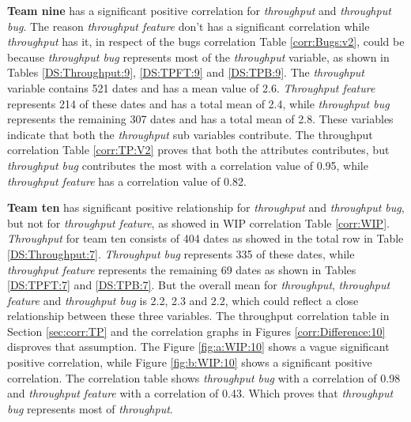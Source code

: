 \documentclass[UKenglish]{ifimaster}  %
\begin{document}
\textbf{Team nine} has a significant positive correlation for \textit{throughput} and \textit{throughput bug}. The reason \textit{throughput feature} don't has a significant correlation while \textit{throughput} has it, in respect of the bugs correlation Table \ref{corr:Bugs:v2}, could be because \textit{throughput bug} represents most of the \textit{throughput} variable, as shown in Tables \ref{DS:Throughput:9}, \ref{DS:TPFT:9} and \ref{DS:TPB:9}. The \textit{throughput} variable contains 521 dates and has a mean value of 2.6. \textit{Throughput feature} represents 214 of these dates and has a total mean of 2.4, while \textit{throughput bug} represents the remaining 307 dates and has a total mean of 2.8. These variables indicate that both the \textit{throughput} sub variables contribute. The throughput correlation Table \ref{corr:TP:V2} proves that both the attributes contributes, but \textit{throughput bug} contributes the most with a correlation value of 0.95, while \textit{throughput feature} has a correlation value of 0.82. 


\textbf{Team ten} has significant positive relationship for \textit{throughput} and \textit{throughput bug}, but not for \textit{throughput feature}, as showed in WIP correlation Table \ref{corr:WIP}. \textit{Throughput} for team ten consists of 404 dates as showed in the total row in Table \ref{DS:Throughput:7}. \textit{Throughput bug} represents 335 of these dates, while \textit{throughput feature} represents the remaining 69 dates as shown in Tables \ref{DS:TPFT:7} and \ref{DS:TPB:7}. But the overall mean for \textit{throughput}, \textit{throughput feature} and \textit{throughput bug} is 2.2, 2.3 and 2.2, which could reflect a close relationship between these three variables. The throughput correlation table in Section \ref{sec:corr:TP} and the correlation graphs in Figures \ref{corr:Difference:10} disproves that assumption. The Figure \ref{fig:a:WIP:10} shows a vague significant positive correlation, while Figure \ref{fig:b:WIP:10} shows a significant positive correlation. The correlation table shows  \textit{throughput bug} with a correlation of 0.98 and \textit{throughput feature} with a correlation of 0.43.  Which proves that \textit{throughput bug} represents most of \textit{throughput}. 
\end{document}
